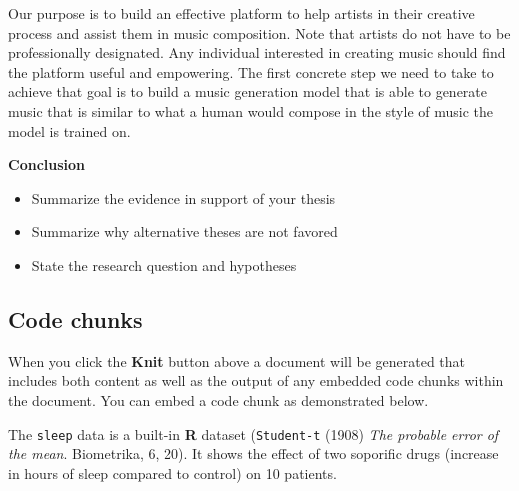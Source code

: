 \documentclass[12pt,oneside]{chicagocapstone}
\providecommand{\tightlist}{%
  \setlength{\itemsep}{0pt}\setlength{\parskip}{0pt}}
\begin{document}
Our purpose is to build an effective platform to help artists in their creative process and assist them in music composition. Note that artists do not have to be professionally designated. Any individual interested in creating music should find the platform useful and empowering. The first concrete step we need to take to achieve that goal is to build a music generation model that is able to generate music that is similar to what a human would compose in the style of music the model is trained on.

\textbf{Conclusion}
\begin{itemize}
\tightlist
\item
  Summarize the evidence in support of your thesis
\item
  Summarize why alternative theses are not favored
\item
  State the research question and hypotheses
\end{itemize}
\newpage

\hypertarget{code-chunks}{%
\subsection*{Code chunks}\label{code-chunks}}

When you click the \textbf{Knit} button above a document will be generated that includes both content as well as the output of any embedded code chunks within the document. You can embed a code chunk as demonstrated below.

The \texttt{sleep} data is a built-in \textbf{R} dataset (\texttt{Student-t} (1908) \emph{The probable error of the mean}. Biometrika, 6, 20). It shows the effect of two soporific drugs (increase in hours of sleep compared to control) on 10 patients.
\end{document}
